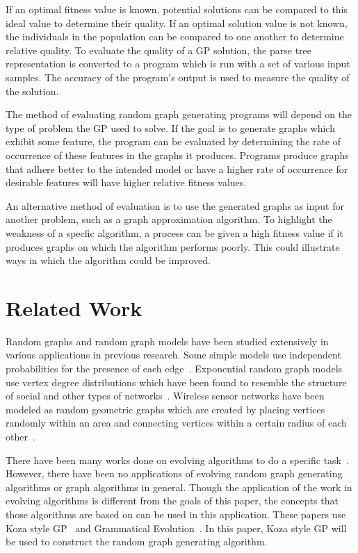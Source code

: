 \documentclass{article}
\begin{document}
If an optimal fitness value is known, potential solutions can be compared to this ideal value to determine
their quality. If an optimal solution value is not known, the individuals in the population can be compared
to one another to determine relative quality. To evaluate the quality of a GP solution, the parse tree
representation is converted to a program which is run with a set of various input samples. The accuracy
of the program's output is used to measure the quality of the solution.

The method of evaluating random graph generating programs will depend on the type of problem the GP
used to solve. If the goal is to generate graphs which exhibit
some feature, the program can be evaluated by determining the rate of occurrence of these features in the
graphs it produces. Programs produce graphs that adhere better to the intended model or have a higher
rate of occurrence for desirable features will have higher relative fitness values.

An alternative method of evaluation is to use the generated graphs as input for another problem, such as
a graph approximation algorithm. To highlight the weakness of a specfic algorithm, a process can be given a
high fitness value if it produces graphs on which the algorithm performs poorly. This could illustrate ways in
which the algorithm could be improved. 

\section{Related Work}

Random graphs and random graph models have been studied extensively in various applications
in previous research. Some simple models use independent probabilities for the presence of
each edge~\cite{Erdos:59,Erdos:60}. Exponential random graph models use vertex degree
distributions which have been found to resemble the structure of social and other types of
networks~\cite{Wasserman:94,Robins:07}. Wireless sensor networks have been modeled as random
geometric graphs which are created by placing vertices randomly within an area and connecting
vertices within a certain radius of each other~\cite{Avin:07,Diaz:01}.
 
There have been many works done on evolving algorithms to do a specific 
task~\cite{Lourenco:12,Martin:13}. However, there have been no applications of evolving
random graph generating algorithms or graph algorithms in general. Though the application of 
the work in evolving algorithms is different from the goals of this paper, the concepts that
those algorithms are based on can be used in this application. These papers use Koza style 
GP~\cite{Koza:92} and Grammatical Evolution~\cite{Ryan:98}. In this paper, Koza
style GP will be used to construct the random graph generating algorithm. 
\end{document}
